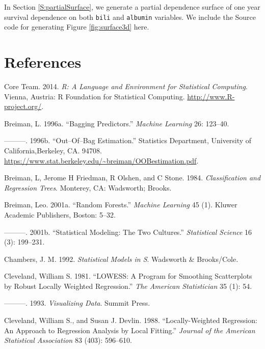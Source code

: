 \documentclass[article]{jss}
\begin{document}
In Section \ref{S:partialSurface}, we generate a partial dependence
surface of one year survival dependence on both \texttt{bili} and
\texttt{albumin} variables. We include the Source code for generating
Figure \ref{fig:surface3d} here.

\section*{References}\label{references}

\hypertarget{refs}{}
\hypertarget{ref-rcore}{}
 Core Team. 2014. \emph{R: A Language and Environment for
Statistical Computing}. Vienna, Austria: R Foundation for Statistical
Computing. \url{http://www.R-project.org/}.

\hypertarget{ref-Breiman:1996}{}
Breiman, L. 1996a. ``Bagging Predictors.'' \emph{Machine Learning} 26:
123--40.

\hypertarget{ref-BreimanOOB:1996e}{}
---------. 1996b. ``Out--Of--Bag Estimation.'' Statistics Department,
University of California,Berkeley, CA. 94708.
\url{https://www.stat.berkeley.edu/~breiman/OOBestimation.pdf}.

\hypertarget{ref-cart:1984}{}
Breiman, L, Jerome H Friedman, R Olshen, and C Stone. 1984.
\emph{Classification and Regression Trees}. Monterey, CA: Wadsworth;
Brooks.

\hypertarget{ref-Breiman:2001}{}
Breiman, Leo. 2001a. ``Random Forests.'' \emph{Machine Learning} 45 (1).
Kluwer Academic Publishers, Boston: 5--32.

\hypertarget{ref-Breiman:twoCultures:2001}{}
---------. 2001b. ``Statistical Modeling: The Two Cultures.''
\emph{Statistical Science} 16 (3): 199--231.

\hypertarget{ref-chambers:1992}{}
Chambers, J. M. 1992. \emph{Statistical Models in S}. Wadsworth \&
Brooks/Cole.

\hypertarget{ref-cleveland:1981}{}
Cleveland, William S. 1981. ``LOWESS: A Program for Smoothing
Scatterplots by Robust Locally Weighted Regression.'' \emph{The American
Statistician} 35 (1): 54.

\hypertarget{ref-cleveland:1993}{}
---------. 1993. \emph{Visualizing Data}. Summit Press.

\hypertarget{ref-cleveland:1988}{}
Cleveland, William S., and Susan J. Devlin. 1988. ``Locally-Weighted
Regression: An Approach to Regression Analysis by Local Fitting.''
\emph{Journal of the American Statistical Association} 83 (403):
596--610.
\end{document}
